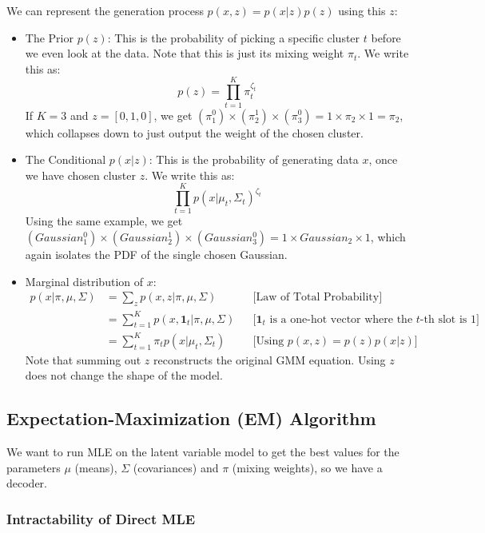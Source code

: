 \documentclass[../Probability.tex]{subfiles}
\begin{document}
\medskip
\noindent We can represent the generation process $p(x, z) = p(x|z)p(z)$ using this $z$:
\begin{itemize}
    \item The Prior $p(z)$: This is the probability of picking a specific cluster $t$ before we even look at the data.
    Note that this is just its mixing weight $\pi_t$. We write this as:
    $$p(z)=\prod_{t=1}^{K}\pi_{t}^{\zeta_{t}}$$
    If $K=3$ and $z = [0, 1, 0]$, we get $(\pi_1^0) \times (\pi_2^1) \times (\pi_3^0) = 1 \times \pi_2 \times 1 = \pi_2$, which collapses down to just output the weight of the chosen cluster.
    \item The Conditional $p(x|z)$: This is the probability of generating data $x$, once we have chosen cluster $z$.
    We write this as:
    $$\prod_{t=1}^{K} p(x|\mu_t, \Sigma_t)^{\zeta_t}$$
    Using the same example, we get $(Gaussian_1^0) \times (Gaussian_2^1) \times (Gaussian_3^0) = 1 \times Gaussian_2 \times 1$, which again isolates the PDF of the single chosen Gaussian. 
    \item Marginal distribution of $x$:
    \begin{align*}
        p(x|\pi,\mu,\Sigma) &= \sum_z p(x,z|\pi,\mu,\Sigma) && \text{[Law of Total Probability]} \\
        &= \sum_{t=1}^K p(x, \mathbf{1}_t|\pi,\mu,\Sigma) && \text{[$\mathbf{1}_t$ is a one-hot vector where the $t$-th slot is 1]} \\
        &= \sum_{t=1}^K \pi_t p(x|\mu_t, \Sigma_t) && \text{[Using $p(x, z) = p(z)p(x|z)$]}
    \end{align*}
    Note that summing out $z$ reconstructs the original GMM equation. Using $z$ does not change the shape of the model.
\end{itemize}

\subsection{Expectation-Maximization (EM) Algorithm}
We want to run MLE on the latent variable model to get the best values for the parameters $\mu$ (means), $\Sigma$ (covariances) and $\pi$ (mixing weights), so we have a decoder.
\subsubsection{Intractability of Direct MLE}
\end{document}
